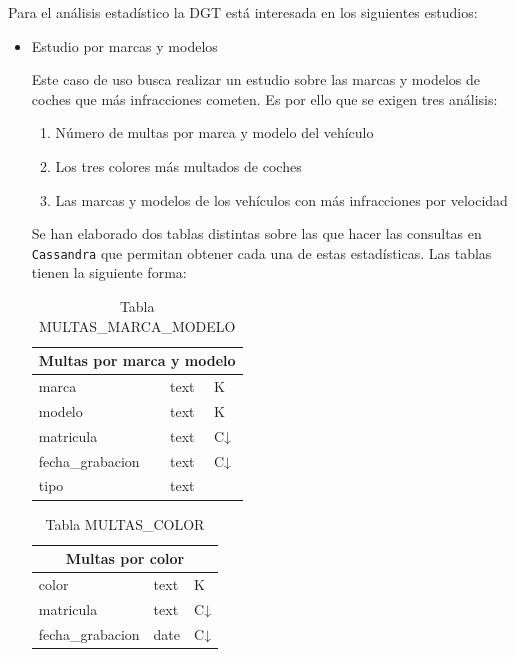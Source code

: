 \documentclass[]{article}
\begin{document}
Para el análisis estadístico la DGT está interesada en los siguientes estudios:
\begin{itemize}
    \item Estudio por marcas y modelos

    Este caso de uso busca realizar un estudio sobre las marcas y modelos de coches que más infracciones cometen. Es por ello que se exigen tres análisis:
    
    \begin{enumerate}
        \item Número de multas por marca y modelo del vehículo
        \item Los tres colores más multados de coches
        \item Las marcas y modelos de los vehículos con más infracciones por velocidad
    \end{enumerate}

    Se han elaborado dos tablas distintas sobre las que hacer las consultas en \texttt{Cassandra} que permitan obtener cada una de estas estadísticas. Las tablas tienen la siguiente forma:
\begin{table}[H]
    \centering
    \begin{tabular}{lll} 
        \toprule
        \multicolumn{3}{c}{\large\textbf{Multas por marca y modelo}} \\ 
        \midrule
        marca              & text & K\\
        modelo             & text & K\\
        matricula          & text & C↓\\
        fecha\_grabacion   & text & C↓\\
        tipo               & text &  \\
        \bottomrule
    \end{tabular}
    \caption {Tabla MULTAS\_MARCA\_MODELO}
\end{table}

\begin{table}[H]
    \centering
    \begin{tabular}{lll} 
        \toprule
        \multicolumn{3}{c}{\large\textbf{Multas por color}} \\ 
        \midrule
        color            & text & K\\
        matricula        & text & C↓\\
        fecha\_grabacion & date & C↓\\
        \bottomrule
    \end{tabular}
    \caption {Tabla MULTAS\_COLOR}
\end{table}
    

\end{itemize}
\end{document}
